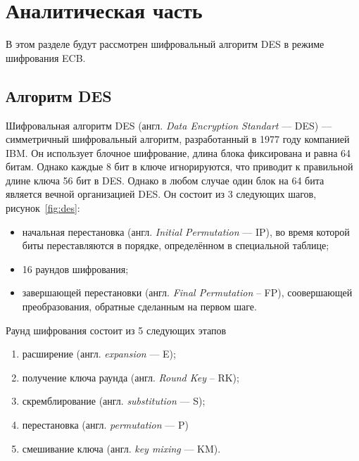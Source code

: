 \chapter{Аналитическая часть}

В этом разделе будут рассмотрен шифровальный алгоритм DES в режиме шифрования ECB.


\section{Алгоритм DES}

Шифровальная алгоритм DES (англ. \textit{Data Encryption Standart} --- DES) --- симметричный шифровальный алгоритм, разработанный в 1977 году компанией IBM. Он использует блочное шифрование, длина блока фиксирована и равна 64 битам. 
Однако каждые 8 бит в ключе игнорируются, что приводит к правильной длине ключа 56 бит в DES. 
Однако в любом случае один блок на 64 бита является вечной организацией DES.
Он состоит из 3 следующих шагов, рисунок~\ref{fig:des}: 
\begin{itemize}
	\item начальная перестановка (англ. \textit{Initial Permutation} --- IP), во время которой биты переставляются в порядке, определённом в специальной таблице;
	\item 16 раундов шифрования;
	\item завершающей перестановки (англ. \textit{Final Permutation} -- FP), соовершающей преобразования, обратные сделанным на первом шаге.
\end{itemize}

Раунд шифрования состоит из 5 следующих этапов
\begin{enumerate}[label=\arabic*)]
	\item расширение (англ. \textit{expansion} --- E);
	\item получение ключа раунда (англ. \textit{Round Key} -- RK);
	\item скремблирование (англ. \textit{substitution} --- S);
	\item перестановка (англ. \textit{permutation} --- P)
	\item смешивание ключа (англ. \textit{key mixing} --- KM).
\end{enumerate}

\clearpage

